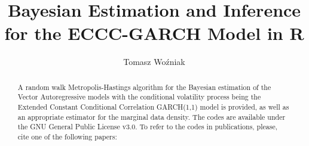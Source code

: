 \documentclass[final,3p,authoryear]{elsarticle}
\begin{document}
 
\newtheorem{thm}{Theorem}
\newtheorem{cl}{Corollary}
\newtheorem{lm}{Lemma}

\begin{frontmatter}

\title{Bayesian Estimation and Inference for the ECCC-GARCH Model in R}%

\author[um]{Tomasz Wo\'zniak}%

\address[um]{
Department of Economics, University of Melbourne, 111 Barry Street, Carlton 3053, Australia\\[1ex]
email: \href{mailto:tomasz.wozniak@unimelb.edu.au}{tomasz.wozniak@unimelb.edu.au}\\[4ex]
\textcopyright{} 2016 by Tomasz Wo\'zniak
}


\begin{abstract}
A random walk Metropolis-Hastings algorithm for the Bayesian estimation of the Vector Autoregressive models with the conditional volatility process being the Extended Constant Conditional Correlation GARCH(1,1) model is provided, as well as an appropriate estimator for the marginal data density. The codes are available under the GNU General Public License v3.0. To refer to the codes in publications, please, cite one of the following papers:


\end{abstract}
\end{frontmatter}
\end{document}
